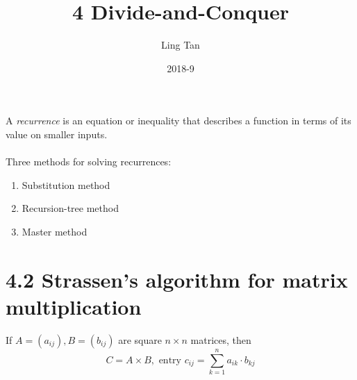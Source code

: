 \documentclass[a4paper]{article}
\title{4 Divide-and-Conquer}
\author{Ling Tan}
\date{2018-9}
\theoremstyle{plain}
\begin{document}
A  \textit{recurrence} is an equation or inequality that describes a function in terms of its value on smaller inputs.\\
\\
Three methods for solving recurrences:
\begin{enumerate}
    \item Substitution method
    \item Recursion-tree method
    \item Master method
\end{enumerate}
\section*{4.2 Strassen’s algorithm for matrix multiplication}
If $A=(a_{ij}), B=(b_{ij})$ are square $n\times n$ matrices, then
\begin{equation*}
    C=A\times B, \text{ entry }c_{ij}=\sum_{k=1}^n a_{ik}\cdot b_{kj}
\end{equation*}
\end{document}
